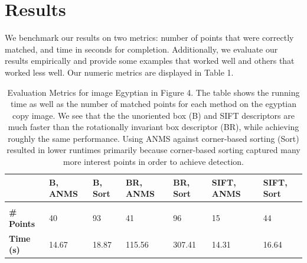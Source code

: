 \documentclass[12pt]{article}
\begin{document}
\section*{Results}

We benchmark our results on two metrics: number of points that were correctly matched, and time in seconds for completion. Additionally, we evaluate our results empirically and provide some examples that worked well and others that worked less well. Our numeric metrics are displayed in Table 1. 

\begin{table}[bp]
\caption{Evaluation Metrics for image Egyptian in Figure 4. The table shows the running time as well as the number of matched points for each method on the egyptian copy image. We see that the the unoriented box (B) and SIFT descriptors are much faster than the rotationally invariant box descriptor (BR), while achieving roughly the same performance. Using ANMS against corner-based sorting (Sort) resulted in lower runtimes primarily because corner-based sorting captured many more interest points in order to achieve detection.}
\label{image}
\begin{center}
\begin{tabular}{l|llllll}
\multicolumn{1}{l}{} & \multicolumn{1}{l}{\bf B, ANMS} & \multicolumn{1}{l}{\bf B, Sort} & \multicolumn{1}{l}{\bf BR, ANMS} & \multicolumn{1}{l}{\bf BR, Sort} & \multicolumn{1}{l}{\bf SIFT, ANMS} & \multicolumn{1}{l}{\bf SIFT, Sort}
\\ \hline \\
{\bf \# Points} & 40 & 93 & 41 & 96 & 15 & 44 \\
{\bf Time (s)} & 14.67 & 18.87 & 115.56 & 307.41 & 14.31 & 16.64 \\
\end{tabular}
\end{center}
\end{table}
\end{document}
